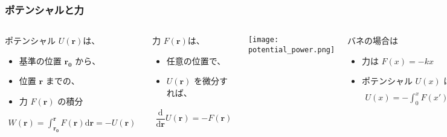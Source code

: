 \documentclass[12pt, dvipdfmx]{beamer}
\newcommand{\rmd}{\mathrm{d}}
\begin{document}
\begin{frame}
	\frametitle{ポテンシャルと力}
	\begin{columns}[T, onlytextwidth]
			\begin{block}{ポテンシャル $U(\bm{r})$は、}
				\begin{itemize}
					\item 基準の位置 $\bm{r_0}$ から、
					\item 位置 $\bm{r}$ までの、
					\item 力 $F(\bm{r})$ の積分
				\end{itemize}
				\vspace{-3mm}
				\scriptsize
				\begin{align*}
					W(\bm{r}) = \int_{\bm{r_0}}^{\bm{r}} F(\bm{r}) \rmd \bm{r} = -U(\bm{r})
				\end{align*}
			\end{block}
			\begin{exampleblock}{力 $F(\bm{r})$は、}
				\begin{itemize}
					\item 任意の位置で、
					\item $U(\bm{r})$ を微分すれば、
				\end{itemize}
				\vspace{-3mm}
				\scriptsize
					\begin{align*}
						\dfrac{\mathrm{d}}{\mathrm{d}\bm{r}} U(\bm{r}) = -F(\bm{r})
					\end{align*}
			\end{exampleblock}
			\begin{center}
				\texttt{[image: potential\_power.png]}
			\end{center}
			\begin{alertblock}{バネの場合は}
				\begin{itemize}
					\item 力は $F(x)=-kx$
					\item ポテンシャル $U(x)$ は
					\vspace{-2mm}
					\scriptsize
					\begin{align*}
						U(x) 
						= -\int_0^x F(x') \rmd x' = \dfrac{1}{2}kx^2
					\end{align*}
				\end{itemize}
			\end{alertblock}
	\end{columns}
\end{frame}
\end{document}
